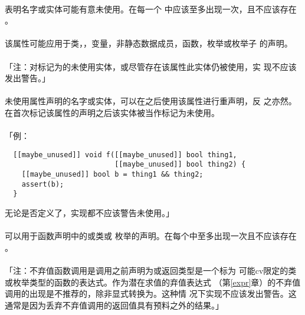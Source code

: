 \paragraph{}
 表明名字或实体可能有意未使用。在每一个
中应该至多出现一次，且不应该存在
。

\paragraph{}
该属性可能应用于类，，变量，非静态数据成员，函数，枚举或枚举子
的声明。

\paragraph{}
「注：对标记为的未使用实体，或尽管存在该属性此实体仍被使用，实
现不应该发出警告。」

\paragraph{}
未使用属性声明的名字或实体，可以在之后使用该属性进行重声明，反
之亦然。在首次标记该属性的声明之后该实体被当作标记为未使用。

\paragraph{}
「例：
\begin{lstlisting}
  [[maybe_unused]] void f([[maybe_unused]] bool thing1,
                          [[maybe_unused]] bool thing2) {
    [[maybe_unused]] bool b = thing1 && thing2;
    assert(b);
  }
\end{lstlisting}
无论是否定义了，实现都不应该警告未使用。」

\paragraph{}
 可以用于函数声明中的或类或
枚举的声明。在每个中至多出现一次且不应该存在
。

\paragraph{}
「注：不弃值函数调用是调用之前声明为或返回类型是一个标为
可能cv限定的类或枚举类型的函数的表达式。作为潜在求值的弃值表达式
（第\ref{expr}章）的不弃值调用的出现是不推荐的，除非显式转换为。这种情
况下实现不应该发出警告。这通常是因为丢弃不弃值调用的返回值具有预料之外的结果。」

